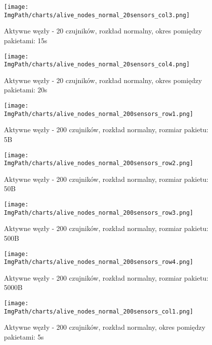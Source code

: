 \documentclass[a4paper,12pt,twoside,openany]{report}
\newcommand{\ImgPath}{./img}
\begin{document}
\begin{figure}[H]
	\begin{center}
		\texttt{[image: \\ImgPath/charts/alive\_nodes\_normal\_20sensors\_col3.png]}
	\end{center}
	\caption{Aktywne węzły - 20 czujników, rozkład normalny, okres pomiędzy pakietami: 15s}
\end{figure}

\begin{figure}[H]
	\begin{center}
		\texttt{[image: \\ImgPath/charts/alive\_nodes\_normal\_20sensors\_col4.png]}
	\end{center}
	\caption{Aktywne węzły - 20 czujników, rozkład normalny, okres pomiędzy pakietami: 20s}
\end{figure}

\begin{figure}[H]
	\begin{center}
		\texttt{[image: \\ImgPath/charts/alive\_nodes\_normal\_200sensors\_row1.png]}
	\end{center}
	\caption{Aktywne węzły - 200 czujników, rozkład normalny, rozmiar pakietu: 5B}
\end{figure}

\begin{figure}[H]
	\begin{center}
		\texttt{[image: \\ImgPath/charts/alive\_nodes\_normal\_200sensors\_row2.png]}
	\end{center}
	\caption{Aktywne węzły - 200 czujników, rozkład normalny, rozmiar pakietu: 50B}
\end{figure}

\begin{figure}[H]
	\begin{center}
		\texttt{[image: \\ImgPath/charts/alive\_nodes\_normal\_200sensors\_row3.png]}
	\end{center}
	\caption{Aktywne węzły - 200 czujników, rozkład normalny, rozmiar pakietu: 500B}
\end{figure}

\begin{figure}[H]
	\begin{center}
		\texttt{[image: \\ImgPath/charts/alive\_nodes\_normal\_200sensors\_row4.png]}
	\end{center}
	\caption{Aktywne węzły - 200 czujników, rozkład normalny, rozmiar pakietu: 5000B}
\end{figure}

\begin{figure}[H]
	\begin{center}
		\texttt{[image: \\ImgPath/charts/alive\_nodes\_normal\_200sensors\_col1.png]}
	\end{center}
	\caption{Aktywne węzły - 200 czujników, rozkład normalny, okres pomiędzy pakietami: 5s}
\end{figure}
\end{document}
